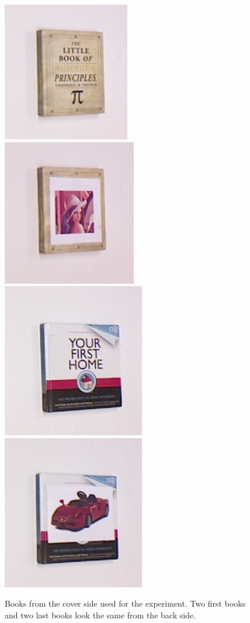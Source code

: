 \begin{figure}
\centering
    		\includegraphics[width = 0.2\columnwidth]{pics/math_cover1_ok.jpg}
    		\includegraphics[width = 0.2\columnwidth]{pics/math_cover2_ok.jpg}
    		\includegraphics[width = 0.2\columnwidth]{pics/first_cover1.jpg}
    		\includegraphics[width = 0.2\columnwidth]{pics/first_cover2.jpg}
    		\caption{Books from the cover side used for the experiment. Two first books and two last books look the same from the back side.}
	\label{fig:object_dataset}
    \end{figure}     
    
